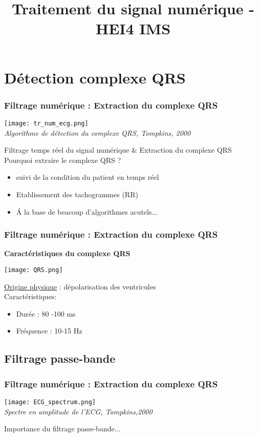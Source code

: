 \documentclass{beamer}
\title[Traitement du signal numérique]{Traitement du signal numérique - HEI4 IMS}
\author[Antony Bazir]{}
\begin{document}
\section{Détection complexe QRS}
\begin{frame}
\frametitle{Filtrage numérique :  Extraction du complexe QRS}
\begin{center}
\texttt{[image: tr\_num\_ecg.png]}\\
\textit{\footnotesize Algorithme de détection du complexe QRS, Tompkins, 2000}\\
\end{center}
Filtrage temps réel du signal numérique \& Extraction du complexe QRS\\
\vspace{0.3cm}
Pourquoi extraire le complexe QRS ?\\
\vspace{0.2cm}
\begin{itemize}
\item suivi de la condition du patient en temps réel 
\item Etablissement des tachogrammes (RR)
\item \'A la base de beacoup d'algorithmes acutels...
\end{itemize}

\end{frame}

\begin{frame}
\frametitle{Filtrage numérique :  Extraction du complexe QRS}
\textbf{Caractéristiques du complexe QRS}
\begin{center}
\texttt{[image: QRS.png]}\\

\end{center}
\underline{Origine physique} : dépolarisation des ventricules\\
\vspace{0.3cm}
Caractéristiques: \\
\vspace{0.1cm}
\begin{itemize}
\item Durée :  80 -100 ms
\item Fréquence : 10-15 Hz 
\end{itemize}

\end{frame}

\subsection{Filtrage passe-bande}
\begin{frame}
\frametitle{Filtrage numérique :  Extraction du complexe QRS}
\begin{center}
\texttt{[image: ECG\_spectrum.png]}\\
\textit{\scriptsize Spectre en amplitude de l'ECG, Tompkins,2000}\\
\vspace{0.1cm}
\end{center}
Importance du filtrage passe-bande...
\end{frame}
\end{document}
